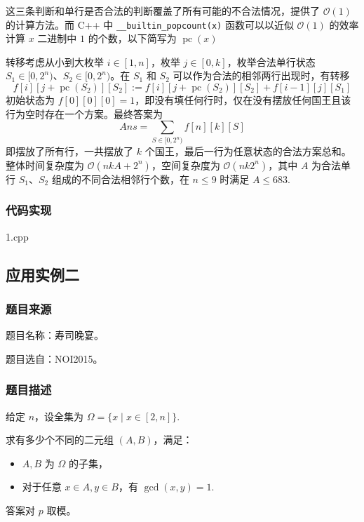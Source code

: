 \documentclass[a4paper, UTF8]{ctexart}
\begin{document}
这三条判断和单行是否合法的判断覆盖了所有可能的不合法情况，提供了
\(\mathcal{O}(1)\) 的计算方法。而 C++ 中
\texttt{\_\_builtin\_popcount(x)} 函数可以以近似 \(\mathcal{O}(1)\)
的效率计算 \(x\) 二进制中 \(1\) 的个数，以下简写为
\(\operatorname{pc}(x)\)

转移考虑从小到大枚举 \(i\in[1,n]\)，枚举 \(j\in[0,k]\)，枚举合法单行状态
\(S_1\in[0,2^n)\)、\(S_2\in[0,2^n)\)。在 \(S_1\) 和 \(S_2\)
可以作为合法的相邻两行出现时，有转移 \[
f[i][j+\operatorname{pc}(S_2)][S_2]:=f[i][j+\operatorname{pc}(S_2)][S_2]+f[i-1][j][S_1]
\] 初始状态为
\(f[0][0][0]=1\)，即没有填任何行时，仅在没有摆放任何国王且该行为空时存在一个方案。最终答案为
\[
Ans=\sum_{S\in[0,2^n)}f[n][k][S]
\] 即摆放了所有行，一共摆放了 \(k\)
个国王，最后一行为任意状态的合法方案总和。整体时间复杂度为
\(\mathcal{O}(nkA+2^n)\)，空间复杂度为 \(\mathcal{O}(nk2^n)\)，其中
\(A\) 为合法单行 \(S_1\)、\(S_2\) 组成的不同合法相邻行个数，在
\(n\le 9\) 时满足 \(A\le 683\).

\subsubsection{代码实现}

1.cpp

\subsection{应用实例二}

\subsubsection{题目来源}

题目名称：寿司晚宴。

题目选自：NOI2015。

\subsubsection{题目描述}

给定 \(n\)，设全集为 \(\Omega=\{x\mid x\in[2,n]\}\).

求有多少个不同的二元组 \((A,B)\)，满足：

\begin{itemize}
\tightlist
\item
  \(A,B\) 为 \(\Omega\) 的子集，
\item
  对于任意 \(x\in A,y\in B\)，有 \(\gcd(x,y)=1\).
\end{itemize}

答案对 \(p\) 取模。
\end{document}
